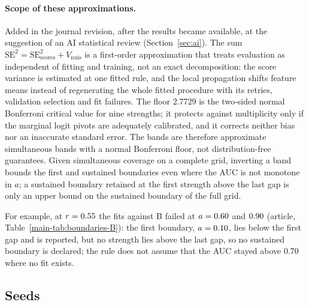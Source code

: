 \paragraph{Scope of these approximations.}
Added in the journal revision, after the results became available, at the suggestion of an AI statistical review (Section~\ref{sec:ai}). The sum $\mathrm{SE}^2=\mathrm{SE}_{\mathrm{scores}}^2+V_{\mathrm{nuis}}$ is a first-order approximation that treats evaluation as independent of fitting and training, not an exact decomposition: the score variance is estimated at one fitted rule, and the local propagation shifts feature means instead of regenerating the whole fitted procedure with its retries, validation selection and fit failures. The floor 2.7729 is the two-sided normal Bonferroni critical value for nine strengths; it protects against multiplicity only if the marginal logit pivots are adequately calibrated, and it corrects neither bias nor an inaccurate standard error. The bands are therefore approximate simultaneous bands with a normal Bonferroni floor, not distribution-free guarantees. Given simultaneous coverage on a complete grid, inverting a band bounds the first and sustained boundaries even where the AUC is not monotone in $a$; a sustained boundary retained at the first strength above the last gap is only an upper bound on the sustained boundary of the full grid.

For example, at $r=\resultnum{v4.tab.T1.B.r055.r}{0.55}$ the fits against B failed at $a=\resultnum{j.b.r055.sustained.gap.0.a}{0.60}$ and $\resultnum{j.b.r055.sustained.gap.1.a}{0.90}$ (article, Table~\ref{main-tab:boundaries-B}): the first boundary, $a=\resultnum{j.b.r055.first.point}{0.10}$, lies below the first gap and is reported, but no strength lies above the last gap, so no sustained boundary is declared; the rule does not assume that the AUC stayed above 0.70 where no fit exists.

\subsection{Seeds}\label{sec:dd-seeds}

